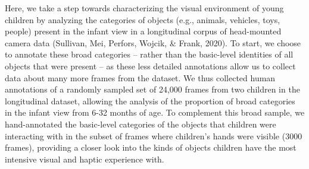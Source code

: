 \documentclass[10pt, letterpaper]{article}
\begin{document}
Here, we take a step towards characterizing the visual environment of
young children by analyzing the categories of objects (e.g., animals,
vehicles, toys, people) present in the infant view in a longitudinal
corpus of head-mounted camera data (Sullivan, Mei, Perfors, Wojcik, \&
Frank, 2020). To start, we choose to annotate these broad categories --
rather than the basic-level identities of all objects that were present
-- as these less detailed annotations allow us to collect data about
many more frames from the dataset. We thus collected human annotations
of a randomly sampled set of 24,000 frames from two children in the
longitudinal dataset, allowing the analysis of the proportion of broad
categories in the infant view from 6-32 months of age. To complement
this broad sample, we hand-annotated the basic-level categories of the
objects that children were interacting with in the subset of frames
where children's hands were visible (3000 frames), providing a closer
look into the kinds of objects children have the most intensive visual
and haptic experience with.
\end{document}
